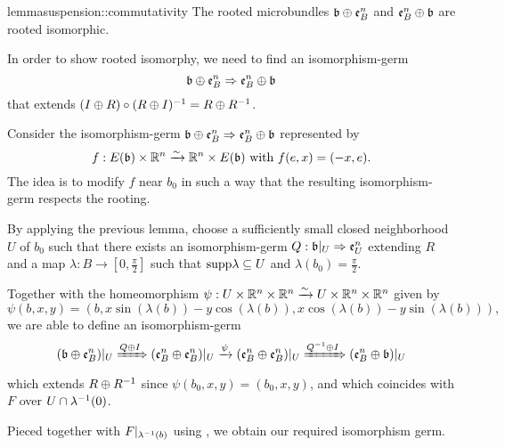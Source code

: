 \begin{mystatement}{lemma}{suspension::commutativity}
    The rooted microbundles
    $\whitney{\bb}{\be{B}}$ and $\whitney{\be{B}}{\bb}$ are rooted isomorphic. 
\end{mystatement}

\begin{myproof}
    In order to show rooted isomorphy,
    we need to find an isomorphism-germ
    \[ \germ{\whitney{\bb}{\be{B}}}{\whitney{\be{B}}{\bb}} \]
    that extends $(I \oplus{} R) \circ (R \oplus{} I)^{-1} = R \oplus{} R^{-1}$.

    Consider the isomorphism-germ
    $\germ{\whitney{\bb}{\be{B}}}{\whitney{\be{B}}{\bb}}$ represented by
    \[ f: E(\bb) \cross \R^n \isomto \R^n \cross E(\bb) \twith f(e, x) = (-x, e). \]
    The idea is to modify $f$ near $b_0$ in such a way that the resulting
    isomorphism-germ respects the rooting.

    By applying the previous lemma,
    choose a sufficiently small closed neighborhood $U$ of $b_0$
    such that there exists an isomorphism-germ
    $\germdef{Q}{\bb[U]}{\be{U}}$ extending $R$
    and a map $\lambda: B \to [0, \frac{\pi}{2}]$
    such that $\text{supp} \lambda \subseteq{} U$ and $\lambda(b_0) = \frac{\pi}{2}$.
    
    Together with the homeomorphism
    $\psi: U \times \mathbb{R}^n \times \mathbb{R}^n \xrightarrow{\sim} U \times \mathbb{R}^n \times \mathbb{R}^n$ given by
    \[ \psi(b, x, y) = (b, x \sin(\lambda(b)) - y \cos(\lambda(b)), x \cos(\lambda(b)) - y \sin(\lambda(b))), \]
    we are able to define an isomorphism-germ
    \[ (\whitney{\bb}{\be{B}})\restr{U} \xRightarrow{Q \oplus I} (\whitney{\be{B}}{\be{B}})\restr{U} \xto{\psi} (\whitney{\be{B}}{\be{B}})\restr{U} \xRightarrow{\inv{Q} \oplus I} (\whitney{\be{B}}{\bb})\restr{U} \]
    which extends $R \oplus{} R^{-1}$ since $\psi(b_0, x, y) = (b_0, x, y)$, and
    which coincides with $F$ over $U \cap \lambda^{-1}(0)$.
    
    Pieced together with $F\vert_{\lambda^{-1}(b)}$ using ,
    we obtain our required isomorphism germ. 
\end{myproof}